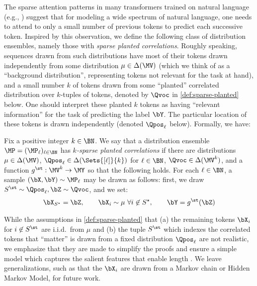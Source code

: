 \documentclass{article}
\begin{document}
The sparse attention patterns in many transformers trained on natural language (e.g., \citet{child_generating_2019,tay_efficient_2022}) suggest that  for modeling a wide spectrum of natural language, one needs to attend to only a small number of previous tokens  to predict each successive token. Inspired by this observation, we define the following class of distribution ensembles, namely those with \emph{sparse planted correlations}. Roughly speaking, sequences drawn from such distributions have most of their tokens drawn independently from some distribution $\mu \in \Delta(\MV)$ (which we think of as a ``background distribution'', representing tokens not relevant for the task at hand), and a small number $k$ of tokens drawn from some ``planted'' correlated distribution over $k$-tuples of tokens, denoted by $\Qvoc$ in \cref{def:sparse-planted} below. One should interpret these planted $k$ tokens as having ``relevant information'' for the task of predicting the label $\bY$. The particular location of these tokens is drawn independently (denoted $\Qpos_\ell$ below). Formally, we have: %
    \begin{definition}
    \label{def:sparse-planted}
    Fix a positive integer $k \in \BN$. %
    We say that a distribution ensemble $\MP = (\MP_\ell)_{\ell \in \BN}$ has \emph{$k$-sparse planted correlations} if there are distributions $\mu \in \Delta(\MV)$, $\Qpos_\ell \in \Delta(\Sets{[\ell]}{k})$ %
    for $\ell \in \BN$, $\Qvoc \in \Delta(\MV^k)$, and a function $g^\st : \MV^k \to \MY$ so that the following holds. For each $\ell \in \BN$, a sample $(\bX, \bY) \sim \MP_\ell$ may be drawn as follows: first, we draw $S^\st \sim \Qpos_\ell, \bZ \sim \Qvoc$, and we set:%
  \begin{align}
\bX_{S^\star} = \bZ, \qquad \bX_i \sim \mu \ \forall i \not \in S^\star, \qquad \bY = g^\st(\bZ)\label{eq:y-gstar-x}
  \end{align}
\end{definition}
While the assumptions in \cref{def:sparse-planted} that (a) the remaining tokens $\bX_i$ for $i \not \in S^\st$ are i.i.d.~from $\mu$ and (b) the tuple $S^\st$ which indexes the correlated tokens that ``matter'' is drawn from a fixed distribution $\Qpos_\ell$ are not realistic, we emphasize that they are made to simplify the proofs and ensure a simple model which captures the salient features that enable length \generalization. We leave generalizations, such as that the $\bX_i$ are drawn from a Markov chain or Hidden Markov Model, for future work.
\end{document}
